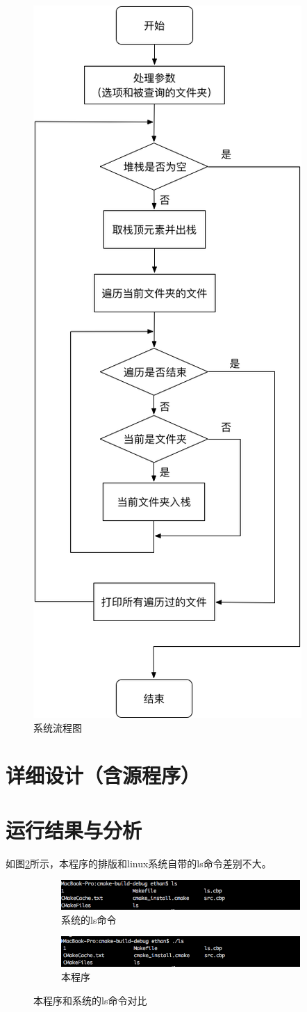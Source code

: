 \documentclass[UTF8,zihao=5,AutoFakeBold]{ctexart}
\begin{document}
\begin{figure}[h]
    \centering
    \includegraphics[width=0.4\linewidth]{流程图}
    \caption{系统流程图}
    \label{fig:flowchart}
\end{figure}

\newpage
\section{详细设计（含源程序）}


\newpage
\section{运行结果与分析}

如图\ref{fig:myls_and_ls}所示，本程序的排版和linux系统自带的ls命令差别不大。

\begin{figure}[h]
    \centering
    \begin{subfigure}[b]{0.7\linewidth}
        \includegraphics[width=\linewidth]{ls}
        \caption{系统的ls命令}
      \end{subfigure}
      \begin{subfigure}[b]{0.7\linewidth}
        \includegraphics[width=\linewidth]{myls}
        \caption{本程序}
      \end{subfigure}
    \caption{本程序和系统的ls命令对比}
    \label{fig:myls_and_ls}
\end{figure}
\end{document}
